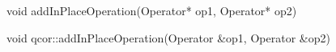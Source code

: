 
\begin{apidefinition}

\begin{Csynopsis}
    void addInPlaceOperation(Operator* op1, Operator* op2)
\end{Csynopsis}

\begin{Cppsynopsis}
    void qcor::addInPlaceOperation(Operator &op1, Operator &op2)
\end{Cppsynopsis}


\begin{apiarguments}
\end{apiarguments}



\apinotes{
    
}

\end{apidefinition}
